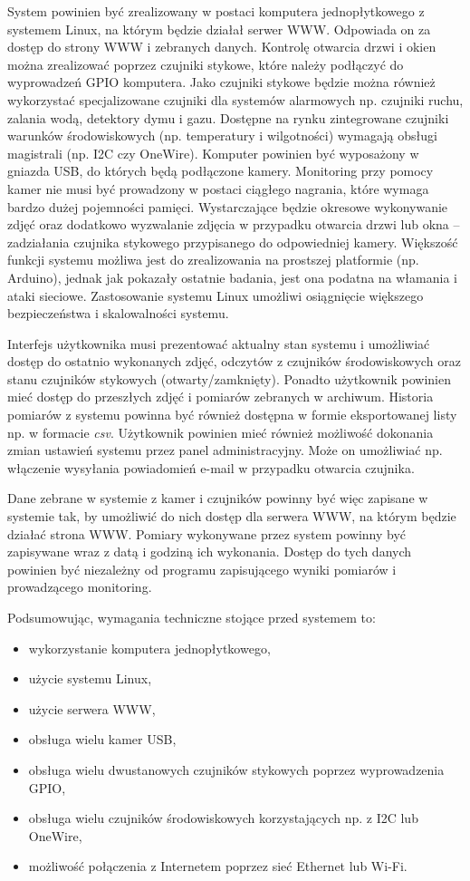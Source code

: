 \documentclass[a4paper,11pt,twoside]{article}
\begin{document}
System powinien być zrealizowany w postaci komputera jednopłytkowego z systemem Linux, na którym będzie działał serwer WWW. Odpowiada on za dostęp do strony WWW i zebranych danych. Kontrolę otwarcia drzwi i okien można zrealizować poprzez czujniki stykowe, które należy podłączyć do wyprowadzeń GPIO komputera. Jako czujniki stykowe będzie można również wykorzystać specjalizowane czujniki dla systemów alarmowych np. czujniki ruchu, zalania wodą, detektory dymu i gazu. Dostępne na rynku zintegrowane czujniki warunków środowiskowych (np. temperatury i wilgotności) wymagają obsługi magistrali (np. I2C czy OneWire). Komputer powinien być wyposażony w gniazda USB, do których będą podłączone kamery. Monitoring przy pomocy kamer nie musi być prowadzony w postaci ciągłego nagrania, które wymaga bardzo dużej pojemności pamięci. Wystarczające będzie okresowe wykonywanie zdjęć oraz dodatkowo wyzwalanie zdjęcia w przypadku otwarcia drzwi lub okna -- zadziałania czujnika stykowego przypisanego do odpowiedniej kamery. Większość funkcji systemu możliwa jest do zrealizowania na prostszej platformie (np. Arduino), jednak jak pokazały ostatnie badania,\cite{arduino-wlamania} jest ona podatna na włamania i ataki sieciowe. Zastosowanie systemu Linux umożliwi osiągnięcie większego bezpieczeństwa i skalowalności systemu. 

Interfejs użytkownika musi prezentować aktualny stan systemu i umożliwiać dostęp do ostatnio wykonanych zdjęć, odczytów z czujników środowiskowych oraz stanu czujników stykowych (otwarty/zamknięty). Ponadto użytkownik powinien mieć dostęp do przeszłych zdjęć i pomiarów zebranych w archiwum. Historia pomiarów z systemu powinna być również dostępna w formie eksportowanej listy np. w formacie \textit{csv}. Użytkownik powinien mieć również możliwość dokonania zmian ustawień systemu przez panel administracyjny. Może on umożliwiać np. włączenie wysyłania powiadomień e-mail w przypadku otwarcia czujnika.

Dane zebrane w systemie z kamer i czujników powinny być więc zapisane w systemie tak, by umożliwić do nich dostęp dla serwera WWW, na którym będzie działać strona WWW. Pomiary wykonywane przez system powinny być zapisywane wraz z datą i godziną ich wykonania. Dostęp do tych danych powinien być niezależny od programu zapisującego wyniki pomiarów i prowadzącego monitoring.

Podsumowując, wymagania techniczne stojące przed systemem to:
\begin{itemize}
\item wykorzystanie komputera jednopłytkowego,
\item użycie systemu Linux,
\item użycie serwera WWW,
\item obsługa wielu kamer USB,
\item obsługa wielu dwustanowych czujników stykowych poprzez wyprowadzenia GPIO,
\item obsługa wielu czujników środowiskowych korzystających np. z I2C lub OneWire,
\item możliwość połączenia z Internetem poprzez sieć Ethernet lub Wi-Fi.
\end{itemize}
\end{document}
